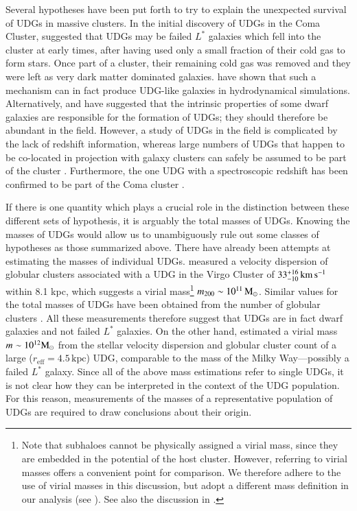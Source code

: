 \documentclass[usenatbib,fleqn]{mnras}
\def\reff{r_\mathrm{eff}}
\begin{document}
Several hypotheses have been put forth to try to explain the unexpected survival of UDGs in massive clusters. In the initial discovery of UDGs in the Coma Cluster, \cite{vandokkum15_coma} suggested that UDGs may be failed $L^*$ galaxies which fell into the cluster at early times, after having used only a small fraction of their cold gas to form stars. Once part of a cluster, their remaining cold gas was removed and they were left as very dark matter dominated galaxies.
\cite{yozin15} have shown that such a mechanism can in fact produce UDG-like galaxies in hydrodynamical simulations.
Alternatively, \cite{amorisco16} and \cite{dicintio17} have suggested that the intrinsic properties of some dwarf galaxies are responsible for the formation of UDGs; they should therefore be abundant in the field. However, a study of UDGs in the field is complicated by the lack of redshift information, whereas large numbers of UDGs that happen to be co-located in projection with galaxy clusters can safely be assumed to be part of the cluster \citep[or at least a significant fraction of them; e.g.,][]{vdburg16}. Furthermore, the one UDG with a spectroscopic redshift has been confirmed to be part of the Coma cluster \citep{vandokkum15_spec}.

If there is one quantity which plays a crucial role in the distinction between these different sets of hypothesis, it is arguably the total masses of UDGs. Knowing the masses of UDGs would allow us to unambiguously rule out some classes of hypotheses as those summarized above. There have already been attempts at estimating the masses of individual UDGs. \cite{beasley16_virgo} measured a velocity dispersion of globular clusters associated with a UDG in the Virgo Cluster of $33_{-10}^{+16}\,\mathrm{km\,s^{-1}}$ within 8.1 kpc, which suggests a virial mass\footnote{Note that subhaloes cannot be physically assigned a virial mass, since they are embedded in the potential of the host cluster. However, referring to virial masses offers a convenient point for comparison. We therefore adhere to the use of virial masses in this discussion, but adopt a different mass definition in our analysis (see ). See also the discussion in \citet{sifon17}.} $m_{200}\sim10^{11}\,\mathrm{M}_\odot$. Similar values for the total masses of UDGs have been obtained from the number of globular clusters \citep{beasley16_acs,peng16}. All these measurements therefore suggest that UDGs are in fact dwarf galaxies and not failed $L^*$ galaxies. On the other hand, \cite{vandokkum16} estimated a virial mass $m\sim10^{12}\mathrm{M}_\odot$ from the stellar velocity dispersion and globular cluster count of a large ($\reff=4.5\,\mathrm{kpc}$) UDG, comparable to the mass of the Milky Way---possibly a failed $L^*$ galaxy. Since all of the above mass estimations refer to single UDGs, it is not clear how they can be interpreted in the context of the UDG population. For this reason, measurements of the masses of a representative population of UDGs are required to draw conclusions about their origin.
\end{document}
